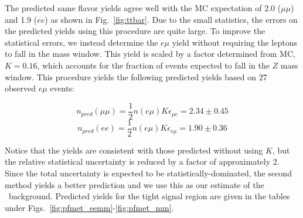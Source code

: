 The predicted same flavor \ttbar yields agree well with the MC expectation of 2.0 ($\mu\mu$) %
and 1.9 ($ee$) %
as shown in Fig.~\ref{fig:ttbar}.
Due to the small statistics, the errors on the predicted yields using this procedure are quite large.
To improve the statistical errors, we instead determine the $e\mu$ yield
without requiring the leptons to fall in the \Z mass window. 
This yield is scaled by a factor determined from MC, $K= 0.16$, 
which accounts for the fraction of \ttbar events expected to fall in the $Z$ mass
window. This procedure yields the following
predicted yields based on 27 observed $e\mu$ events:

\begin{equation}
n_{pred}(\mu\mu) = \frac{1}{2}n(e\mu)K\epsilon_{\mu e} = 2.34 \pm 0.45
\end{equation}
\begin{equation}
n_{pred}(ee)     = \frac{1}{2}n(e\mu)K\epsilon_{e\mu} = 1.90 \pm 0.36
\end{equation}

Notice that the yields are consistent with those predicted without using $K$, but the relative statistical uncertainty is reduced by a factor of approximately 2.
Since the total uncertainty is expected to be statistically-dominated, the second method yields a better prediction and we use this as our estimate
of the \ttbar~background. Predicted yields for the tight signal region are given in the tables under Figs.~\ref{fig:pfmet_eemm}-\ref{fig:pfmet_mm}.

